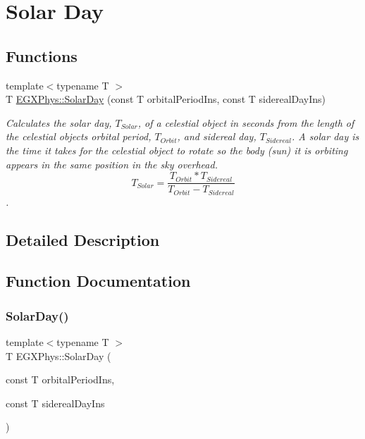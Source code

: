 \hypertarget{group___e_g_x_phys-_astrophysic-_solar_day}{}\section{Solar Day}
\label{group___e_g_x_phys-_astrophysic-_solar_day}
\subsection*{Functions}
\begin{DoxyCompactItemize}
\item 
{\footnotesize template$<$typename T $>$ }\\T \mbox{\hyperlink{group___e_g_x_phys-_astrophysic-_solar_day_gae321e0dd0c031a57c45b15dc819635e0}{E\+G\+X\+Phys\+::\+Solar\+Day}} (const T orbital\+Period\+Ins, const T sidereal\+Day\+Ins)
\begin{DoxyCompactList}\small\item\em Calculates the solar day, $T_{Solar}$, of a celestial object in seconds from the length of the celestial object\textquotesingle{}s orbital period, $T_{Orbit}$, and sidereal day, $T_{Sidereal}$. A solar day is the time it takes for the celestial object to rotate so the body (sun) it is orbiting appears in the same position in the sky overhead. \[ T_{Solar}=\dfrac{T_{Orbit} * T_{Sidereal}}{T_{Orbit} - T_{Sidereal}}\]. \end{DoxyCompactList}\end{DoxyCompactItemize}


\subsection{Detailed Description}


\subsection{Function Documentation}
\mbox{\label{group___e_g_x_phys-_astrophysic-_solar_day_gae321e0dd0c031a57c45b15dc819635e0}} 
\subsubsection{\texorpdfstring{Solar\+Day()}{SolarDay()}}
{\footnotesize\ttfamily template$<$typename T $>$ \\
T E\+G\+X\+Phys\+::\+Solar\+Day (\begin{DoxyParamCaption}\item[{const T}]{orbital\+Period\+Ins,  }\item[{const T}]{sidereal\+Day\+Ins }\end{DoxyParamCaption})}



